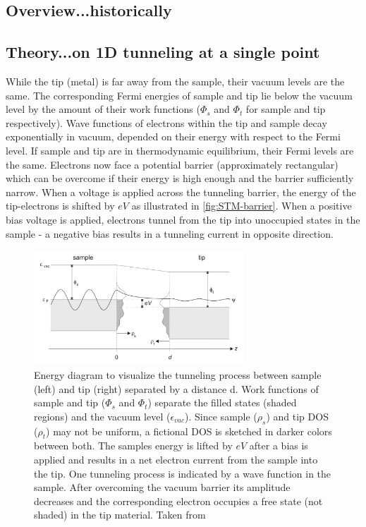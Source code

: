 \subsection{Overview...historically}
\subsection{Theory...on 1D tunneling at a single point}
While the tip (metal) is far away from the sample, their vacuum levels are the same. The corresponding Fermi energies of sample and tip lie below the vacuum level by the amount of their work functions ($\Phi_s$ and $\Phi_t$ for sample and tip respectively). Wave functions of electrons within the tip and sample decay exponentially in vacuum, depended on their energy with respect to the Fermi level.
If sample and tip are in thermodynamic equilibrium, their Fermi levels are the same. Electrons now face a potential barrier (approximately rectangular) which can be overcome if their energy is high enough and the barrier sufficiently narrow. When a voltage is applied across the tunneling barrier, the energy of the tip-electrons is shifted by $eV$ as illustrated in \autoref{fig:STM-barrier}. When a positive bias voltage is applied, electrons tunnel from the tip into unoccupied states in the sample - a negative bias results in a tunneling current in opposite direction. 

\begin{figure}[]\centering
	\includegraphics[width=0.7\textwidth]{./images/tunnel-barrier}
	\caption{Energy diagram to visualize the tunneling process between sample (left) and tip (right) separated by a distance d. Work functions of sample and tip ($\Phi_s$ and $\Phi_t$) separate the filled states (shaded regions) and the vacuum level ($\epsilon_{vac}$). Since sample ($\rho_s$) and tip DOS ($\rho_t$) may not be uniform, a fictional DOS is sketched in darker colors between both. The samples energy is lifted by $eV$ after a bias is applied and results in a net electron current from the sample into the tip. One tunneling process is indicated by a wave function in the sample. After overcoming the vacuum barrier its amplitude decreases and the corresponding electron occupies a free state (not shaded) in the tip material.  Taken from \cite{diss-schunack}}
	\label{fig:STM-barrier}
\end{figure}


